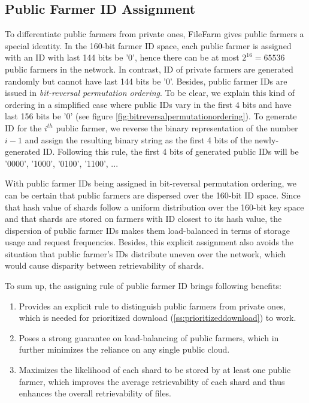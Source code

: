 \subsection{Public Farmer ID Assignment}
\label{ss:publicfarmeridassignment}

To differentiate public farmers from private ones, FileFarm gives public farmers a special identity. In the 160-bit farmer ID space, each public farmer is assigned with an ID with last 144 bits be '0', hence there can be at most $2^{16}=65536$ public farmers in the network. In contrast, ID of private farmers are generated randomly but cannot have last 144 bits be '0'. Besides, public farmer IDs are issued in \textit{bit-reversal permutation ordering}. To be clear, we explain this kind of ordering in a simplified case where public IDs vary in the first 4 bits and have last 156 bits be '0' (see figure \ref{fig:bitreversalpermutationordering}). To generate ID for the $i^{th}$ public farmer, we reverse the binary representation of the number $i-1$ and assign the resulting binary string as the first 4 bits of the newly-generated ID. Following this rule, the first 4 bits of generated public IDs will be '0000', '1000', '0100', '1100', ...

With public farmer IDs being assigned in bit-reversal permutation ordering, we can be certain that public farmers are dispersed over the 160-bit ID space. Since that hash value of shards follow a uniform distribution over the 160-bit key space and that shards are stored on farmers with ID closest to its hash value, the dispersion of public farmer IDs makes them load-balanced in terms of storage usage and request frequencies. Besides, this explicit assignment also avoids the situation that public farmer's IDs distribute uneven over the network, which would cause disparity between retrievability of shards.

To sum up, the assigning rule of public farmer ID brings following benefits:

\begin{enumerate}
  \item Provides an explicit rule to distinguish public farmers from private ones, which is needed for prioritized download (\ref{ss:prioritizeddownload}) to work.
  \item Poses a strong guarantee on load-balancing of public farmers, which in further minimizes the reliance on any single public cloud.
  \item Maximizes the likelihood of each shard to be stored by at least one public farmer, which improves the average retrievability of each shard and thus enhances the overall retrievability of files.
\end{enumerate}

